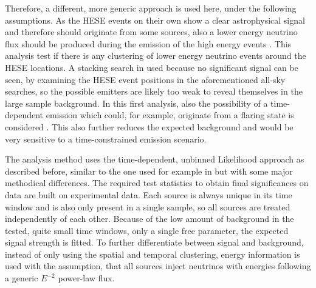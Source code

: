 Therefore, a different, more generic approach is used here, under the following assumptions.
As the HESE events on their own show a clear astrophysical signal and therefore should originate from some sources, also a lower energy neutrino flux should be produced during the emission of the high energy events \cite{MESZAROS2014241,Murase:2014tsa}.
This analysis test if there is any clustering of lower energy neutrino events around the HESE locations.
A stacking search in used because no significant signal can be seen, by examining the HESE event positions in the aforementioned all-sky searches, so the possible emitters are likely too weak to reveal themselves in the large sample background.
In this first analysis, also the possibility of a time-dependent emission which could, for example, originate from a flaring state is considered \cite{Mundell:2011radio,Goosmann:2004hw,Eichmann:2012blazars}.
This also further reduces the expected background and would be very sensitive to a time-constrained emission scenario.

The analysis method uses the time-dependent, unbinned Likelihood approach as described before, similar to the one used for example in \cite{Aartsen:2017zvw} but with some major methodical differences.
The required test statistics to obtain final significances on data are built on experimental data.
Each source is always unique in its time window and is also only present in a single sample, so all sources are treated independently of each other.
Because of the low amount of background in the tested, quite small time windows, only a single free parameter, the expected signal strength is fitted.
To further differentiate between signal and background, instead of only using the spatial and temporal clustering, energy information is used with the assumption, that all sources inject neutrinos with energies following a generic $E^{-2}$ power-law flux.



